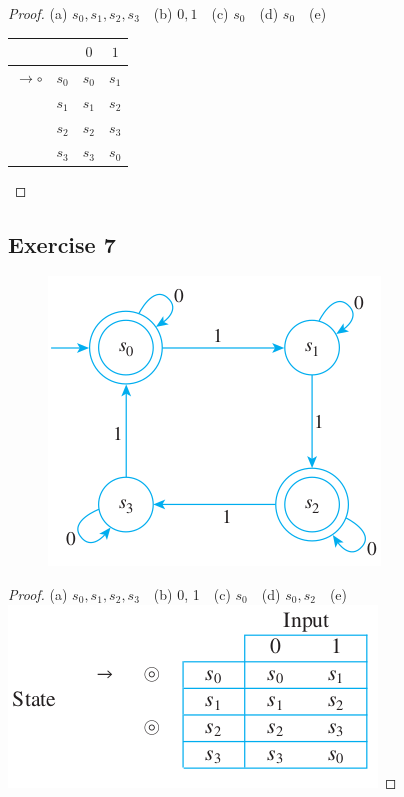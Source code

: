\documentclass[14pt]{extarticle}
\begin{document}
\begin{proof}
    (a) \(s_0, s_1, s_2, s_3\) \,\, (b) \(0, 1\) \,\, (c) \(s_0\) \,\, (d) \(s_0\) \,\, (e)
    \begin{tabular}{|c|c|c|c|}
        \hline
        \(\)          & \(\)    & \(0\)   & \(1\)   \\
        \hline
        \(\to \circ\) & \(s_0\) & \(s_0\) & \(s_1\) \\
        \hline
        \(\)          & \(s_1\) & \(s_1\) & \(s_2\) \\
        \hline
        \(\)          & \(s_2\) & \(s_2\) & \(s_3\) \\
        \hline
        \(\)          & \(s_3\) & \(s_3\) & \(s_0\) \\
        \hline
    \end{tabular}
\end{proof}

\subsection{Exercise 7}
\begin{figure}[ht!]
    \centering
    \includegraphics[scale=0.5]{../images/12.2.7.png}
\end{figure}

\begin{proof}
    (a) \(s_0, s_1, s_2, s_3\) \,\, (b) 0, 1 \,\, (c) \(s_0\) \,\,
    (d) \(s_0, s_2\) \,\, (e)
    \includegraphics[scale=0.5]{../images/12.2.7.e.png}
\end{proof}
\end{document}
